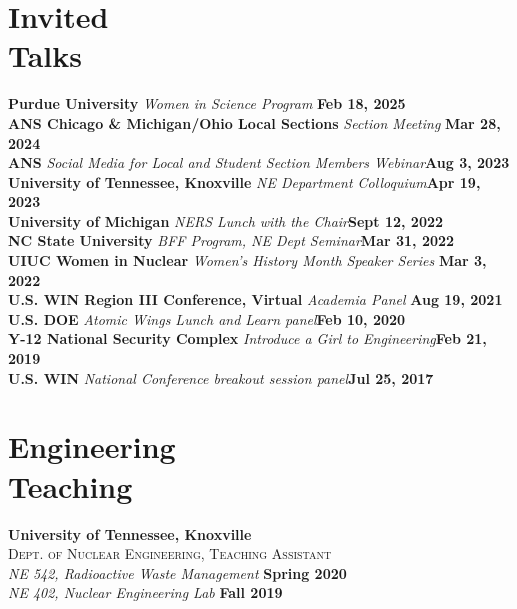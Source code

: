 \documentclass[margin,line]{resume}
\begin{document}
\begin{resume}
    \section{\mysidestyle Invited\\Talks}
    \textbf{Purdue University} \textsl{Women in Science Program} \hfill \textbf{Feb 18, 2025}\\ 
    \textbf{ANS Chicago \& Michigan/Ohio Local Sections} \textsl{Section Meeting} \hfill\textbf{Mar 28, 2024}\\
    \textbf{ANS} \textsl{Social Media for Local and Student Section Members Webinar}\hfill \textbf{Aug 3, 2023}\\
    \textbf{University of Tennessee, Knoxville} \textsl{NE Department Colloquium}\hfill \textbf{Apr 19, 2023}\\
    \textbf{University of Michigan} \textsl{NERS Lunch with the Chair}\hfill \textbf{Sept 12, 2022}\\
    \textbf{NC State University} \textsl{BFF Program, NE Dept Seminar}\hfill\textbf{Mar 31, 2022}\\
    \textbf{UIUC Women in Nuclear} \textsl{Women's History Month Speaker Series} \hfill\textbf{Mar 3, 2022}\\
    \textbf{U.S. WIN Region III Conference, Virtual} \textsl{Academia Panel} \hfill \textbf{Aug 19, 2021}\\
    \textbf{U.S. DOE} \textsl{Atomic Wings Lunch and Learn panel}\hfill \textbf{Feb 10, 2020} \\
    \textbf{Y-12 National Security Complex} \textsl{Introduce a Girl to Engineering}\hfill \textbf{Feb 21, 2019} \\
    \textbf{U.S. WIN} \textsl{National Conference breakout session panel}\hfill \textbf{Jul 25, 2017}
    \section{\mysidestyle Engineering\\Teaching}
    \textbf{University of Tennessee, Knoxville}\\
    \textsc{Dept. of Nuclear Engineering, Teaching Assistant}\\
               \textsl{NE 542, Radioactive Waste Management} \hfill \textbf{Spring 2020}\\
               \textsl{NE 402, Nuclear Engineering Lab} \hfill \textbf{Fall 2019}
               \vspace{2mm}


\end{resume}
\end{document}
